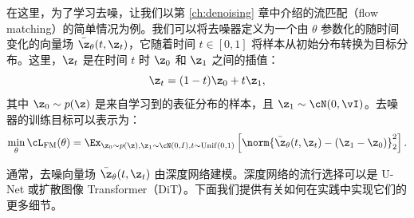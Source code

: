 \documentclass[../../book-main_zh.tex]{subfiles}
\begin{document}
在这里，为了学习去噪，让我们以第 \ref{ch:denoising} 章中介绍的流匹配（flow matching）的简单情况为例。我们可以将去噪器定义为一个由 $\theta$ 参数化的随时间变化的向量场 $\bar{\z}_{\theta}(t,
\z_t)$，它随着时间 $t \in [0,
1]$ 将样本从初始分布转换为目标分布。这里，$\z_t$ 是在时间 $t$ 时 $\z_0$ 和 $\z_1$ 之间的插值：
\begin{equation}
\z_t = (1 - t)\z_0 + t\z_1,
\end{equation}
其中 $\z_0 \sim p(\z)$ 是来自学习到的表征分布的样本，且 $\z_1 \sim \cN(0, \vI)$。去噪器的训练目标可以表示为：
\begin{equation}
\min_{\theta} \cL_{\mathrm{FM}}(\theta) = \Ex_{\z_0 \sim p(\z), \z_1
\sim \cN(0, I), t \sim \mathrm{Unif}(0, 1)} \left[
\norm{\bar{\z}_{\theta}(t,\z_t) - (\z_1 - \z_0)}_2^2 \right].
\end{equation}

通常，去噪向量场 $\bar{\z}_{\theta}(t,
\z_t)$ 由深度网络建模。深度网络的流行选择可以是 U-Net 或扩散图像 Transformer（DiT）。下面我们提供有关如何在实践中实现它们的更多细节。





\end{document}

